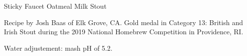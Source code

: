 \begin{recipe}{Sticky Faucet Oatmeal Milk Stout} %

\begin{aboutblock}
Recipe by Josh Baas of Elk Grove, CA. Gold medal in Category 13:
British and Irish Stout during the 2019 National Homebrew Competition
in Providence, RI. \sourceaha
\end{aboutblock}


\begin{methodandtiming}
 
\begin{mashsteps}
\end{mashsteps}

\begin{fermentationsteps}
\end{fermentationsteps}

\begin{directions}
Water adjustement: mash pH of 5.2.
\end{directions}

\end{methodandtiming}

\recipebreak

\begin{ingredientsblock}

\begin{malts}
\end{malts}

\begin{hops}
\end{hops}


\end{ingredientsblock}

\end{recipe}
